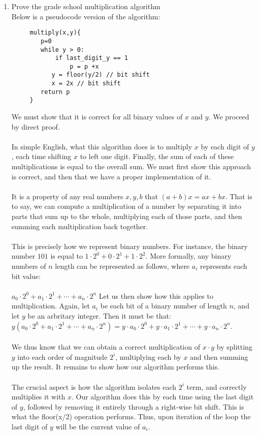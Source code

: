 \documentclass{article}
\begin{document}
\begin{enumerate}
\begin{itemize}
\begin{verbatim}
        \end{verbatim}
	\end{itemize}
	\item Prove the grade school multiplication algorithm
	\\ Below is a pseudocode version of the algorithm:
	\begin{verbatim}
	 multiply(x,y){
	    p=0
	    while y > 0:
	        if last_digit_y == 1
	            p = p +x
	       y = floor(y/2) // bit shift
	       x = 2x // bit shift
	    return p
	 }
	\end{verbatim}
	We must show that it is correct for all binary values of $x$ and $y$. We proceed by direct proof.
	\\\\ In simple English, what this algorithm does is to multiply $x$ by each digit of $y$, each time shifting $x$ to left one digit. Finally, the sum of each of these multiplications is equal to the overall sum. We must first show this approach is correct, and then that we have a proper implementation of it.
	\\\\ It is a property of any real numbers $x,y,b$ that $(a+b)x=ax+bx$. That is to say, we can compute a multiplication of a number by separating it into parts that sum up to the whole, multiplying each of those parts, and then summing each multiplication back together. 
	\\\\ This is precisely how we represent binary numbers. For instance, the binary number $101$ is equal to $1\cdot 2^0 + 0\cdot 2^1 + 1\cdot 2^2$. More formally, any binary numbers of $n$ length can be represented as follows, where $a_i$ represents each bit value:
	\\\\ $a_0 \cdot 2^0 + a_1 \cdot 2^1 + \cdots + a_n \cdot 2^n$
	Let us then show how this applies to multiplication. Again, let $a_i$ be each bit of a binary number of length $n$, and let $y$ be an arbritary integer. Then it must be that:
	$y(a_0 \cdot 2^0 + a_1 \cdot 2^1 + \cdots + a_n \cdot 2^n) = y \cdot a_0 \cdot 2^0 + y \cdot a_1 \cdot 2^1 + \cdots + y \cdot a_n \cdot 2^n$.
	\\\\ We thus know that we can obtain a correct multiplication of $x\cdot y$ by splitting $y$ into each order of magnitude $2^i$, multiplying each by $x$ and then summing up the result. It remains to show how our algorithm performs this.
	\\\\ The crucial aspect is how the algorithm isolates each $2^i$ term, and correctly multiplies it with $x$. Our algorithm does this by each time using the last digit of $y$, followed by removing it entirely through a right-wise bit shift. This is what the floor(x/2) operation performs. Thus, upon iteration of the loop the last digit of $y$ will be the current value of $a_i$.

\end{enumerate}
\end{document}
